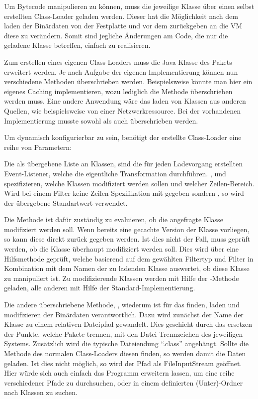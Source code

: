 Um Bytecode manipulieren zu können, muss die jeweilige Klasse über einen selbst erstellten Class-Loader geladen werden. Dieser hat die Möglichkeit nach dem laden der Binärdaten von der Festplatte und vor dem zurückgeben an die \ac{VM} diese zu verändern. Somit sind jegliche Änderungen am Code, die nur die geladene Klasse betreffen, einfach zu realisieren.

Zum erstellen eines eigenen Class-Loaders muss die Java-Klasse  des  Pakets erweitert werden. Je nach Aufgabe der eigenen Implementierung können nun verschiedene Methoden überschrieben werden. Beispielsweise könnte man hier ein eigenes Caching implementieren, wozu lediglich die  Methode überschrieben werden muss. Eine andere Anwendung wäre das laden von Klassen aus anderen Quellen, wie beispielsweise von einer Netzwerkressource. Bei der vorhandenen Implementierung musste sowohl  als auch  überschrieben werden.

Um dynamisch konfigurierbar zu sein, benötigt der erstellte Class-Loader eine reihe von Parametern:



Die als  übergebene Liste an Klassen, sind die für jeden Ladevorgang erstellten Event-Listener, welche die eigentliche Transformation durchführen. ,  und  spezifizieren, welche Klassen modifiziert werden sollen und welcher Zeilen-Bereich. Wird bei einem Filter keine Zeilen-Spezifikation mit gegeben sondern , so wird der übergebene Standartwert verwendet.

Die Methode  ist dafür zuständig zu evaluieren, ob die angefragte Klasse modifiziert werden soll. Wenn bereits eine gecachte Version der Klasse vorliegen, so kann diese direkt zurück gegeben werden. Ist dies nicht der Fall, muss geprüft werden, ob die Klasse überhaupt modifiziert werden soll. Dies wird über eine Hilfsmethode geprüft, welche basierend auf dem gewählten Filtertyp und Filter in Kombination mit dem Namen der zu ladenden Klasse auswertet, ob diese Klasse zu manipuliert ist. Zu modifizierende Klassen werden mit Hilfe der -Methode geladen, alle anderen mit Hilfe der Standard-Implementierung.

Die andere überschriebene Methode, , wiederum ist für das finden, laden und modifizieren der Binärdaten verantwortlich. Dazu wird zunächst der Name der Klasse zu einem relativen Dateipfad gewandelt. Dies geschieht durch das ersetzen der Punkte, welche Pakete trennen, mit den Datei-Trennzeichen des jeweiligen Systems. Zusätzlich wird die typische Dateiendung "`.class"' angehängt. Sollte die Methode  des normalen Class-Loaders diesen finden, so werden damit die Daten geladen. Ist dies nicht möglich, so wird der Pfad als FileInputStream geöffnet. Hier würde sich auch einfach das Programm erweitern lassen, um eine reihe verschiedener Pfade zu durchsuchen, oder in einem definierten (Unter)-Ordner nach Klassen zu suchen.

